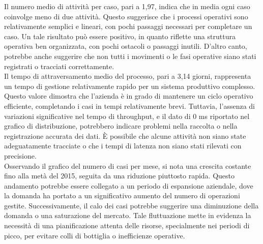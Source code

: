 \documentclass{article}
\begin{document}
Il numero medio di attività per caso, pari a 1,97, indica che in media ogni caso coinvolge meno di due attività. Questo suggerisce che i processi operativi sono relativamente semplici e lineari, con pochi passaggi necessari per completare un caso. Un tale risultato può essere positivo, in quanto riflette una struttura operativa ben organizzata, con pochi ostacoli o passaggi inutili. D'altro canto, potrebbe anche suggerire che non tutti i movimenti o le fasi operative siano stati registrati o tracciati correttamente.\\
Il tempo di attraversamento medio del processo, pari a 3,14 giorni, rappresenta un tempo di gestione relativamente rapido per un sistema produttivo complesso. Questo valore dimostra che l'azienda è in grado di mantenere un ciclo operativo efficiente, completando i casi in tempi relativamente brevi. Tuttavia, l'assenza di variazioni significative nel tempo di throughput, e il dato di 0 ms riportato nel grafico di distribuzione, potrebbero indicare problemi nella raccolta o nella registrazione accurata dei dati. È possibile che alcune attività non siano state adeguatamente tracciate o che i tempi di latenza non siano stati rilevati con precisione.\\
Osservando il grafico del numero di casi per mese, si nota una crescita costante fino alla metà del 2015, seguita da una riduzione piuttosto rapida. Questo andamento potrebbe essere collegato a un periodo di espansione aziendale, dove la domanda ha portato a un significativo aumento del numero di operazioni gestite. Successivamente, il calo dei casi potrebbe suggerire una diminuzione della domanda o una saturazione del mercato. Tale fluttuazione mette in evidenza la necessità di una pianificazione attenta delle risorse, specialmente nei periodi di picco, per evitare colli di bottiglia o inefficienze operative.\\
\end{document}
